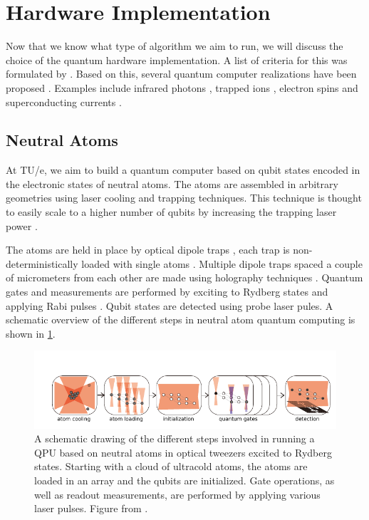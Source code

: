 \section{Hardware Implementation}

Now that we know what type of algorithm we aim to run, we will discuss the choice of the quantum hardware implementation. A list of criteria for this was formulated by \cite{DiVincenzo2000}. Based on this, several quantum computer realizations have been proposed \cite{Ladd2010}. Examples include infrared photons \cite{Matthews2009},  trapped ions \cite{Benhelm2008,Schindler2013}, electron spins \cite{Press2008} and superconducting currents \cite{DiCarlo2009,Arute2019}. 

\subsection{Neutral Atoms}

At TU/e, we aim to build a quantum computer based on qubit states encoded in the electronic states of neutral atoms. The atoms are assembled in arbitrary geometries using laser cooling and trapping techniques. This technique is thought to easily scale to a higher number of qubits by increasing the trapping laser power \cite{Henriet2020}. 

The atoms are held in place by optical dipole traps \cite{Chu1986}, each trap is non-deterministically loaded with single atoms \cite{Schlosser2001}. Multiple dipole traps spaced a couple of micrometers from each other are made using holography techniques \cite{Bergamini2004}. Quantum gates and measurements are performed by exciting to Rydberg states and applying Rabi pulses \cite{Levine2018,Madjarov2020}. Qubit states are detected using probe laser pules. A schematic overview of the different steps in neutral atom quantum computing is shown in \cref{fig:ComputingSteps}.

\begin{figure}
	\centering
	\includegraphics[width=\linewidth]{figures/ComputingSteps.pdf}
	\caption{A schematic drawing of the different steps involved in running a QPU based on neutral atoms in optical tweezers excited to Rydberg states. Starting with a cloud of ultracold atoms, the atoms are loaded in an array and the qubits are initialized. Gate operations, as well as readout measurements, are performed by applying various laser pulses. Figure from \cite{Wu2021}.}
	\label{fig:ComputingSteps}
\end{figure}

